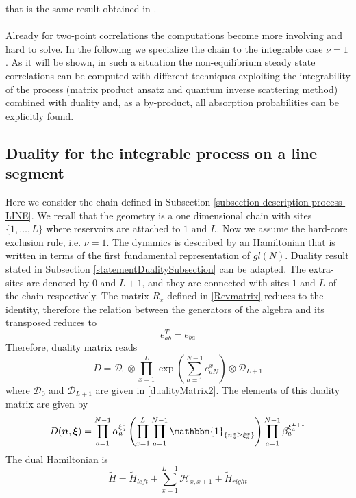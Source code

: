 \documentclass[10pt]{article}
\numberwithin{equation}{section}
\numberwithin{equation}{subsection}
\begin{document}
that is the same result obtained in \cite{vanicat2017exact}. 
\\
\\ Already for two-point correlations the computations become more involving and hard to solve. In the following we specialize the chain to the integrable case $\nu=1$. As it will be shown, in such a situation the non-equilibrium steady state correlations can be computed with different techniques exploiting the integrability of the process (matrix product ansatz and quantum inverse scattering method) combined with duality and, as a by-product, all absorption probabilities can be explicitly found. 
\subsection{Duality for the integrable process on a line segment}\label{integrableChain-duality}
Here we consider the chain defined in Subsection \ref{subsection-description-process-LINE}. We recall that the geometry is a one dimensional chain with sites $\{1,\ldots,L\}$ where reservoirs are attached to $1$ and $L$. Now we assume the hard-core exclusion rule, i.e. $\nu=1$. The dynamics is described by an Hamiltonian that is written in terms of the first fundamental representation of $gl(N)$. Duality result stated in Subsection \ref{statementDualitySubsection} can be adapted. The extra-sites are denoted by $0$ and $L+1$, and they are connected with sites $1$ and $L$ of the chain respectively. The matrix $R_{x}$ defined in \eqref{Revmatrix} 
reduces to the identity, therefore the relation between the generators of the algebra and its transposed reduces to
\begin{equation}\label{transpostionPropertyFund}
	e_{ab}^T= e_{ba}
\end{equation}
Therefore, duality matrix reads
\begin{equation}
	D=\mathcal{D}_{0}\otimes\prod_{x=1}^{L}\exp{\left(\sum_{a=1}^{N-1}e_{aN}^{x}\right)}\otimes \mathcal{D}_{L+1}
\end{equation}
where $\mathcal{D}_{0}$ and $\mathcal{D}_{L+1}$ are given in \eqref{dualityMatrix2}. 
The elements of this duality matrix are given by
\begin{equation}\label{ElementsDualityMatrixChain}
	D(\bm{n},\bm{\xi})=\prod_{a=1}^{N-1}\alpha_{a}^{\xi_{a}^{0}}\left(\prod_{x=1}^{L}\prod_{a=1}^{N-1}\mathbbm{1}_{\{n_{a}^{x}\geq \xi_{a}^{x}\}}\right)\prod_{a=1}^{N-1}\beta_{a}^{\xi_{a}^{L+1}}
\end{equation}
The dual Hamiltonian is
\begin{equation}
	\widetilde{H}=\widetilde{H}_{left}+\sum_{x=1}^{L-1}\mathcal{H}_{x,x+1}+\widetilde{H}_{right}
\end{equation}
\end{document}
